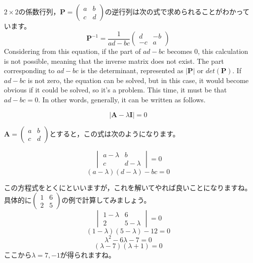 \documentclass{ltjsbook}
\begin{document}
$2 \times 2$の係数行列，$\bm{P}=\begin{pmatrix} a&b\\c&d \end{pmatrix}$の逆行列は次の式で求められることがわかっています。
\[ \bm{P}^{-1}= \frac{1}{ad-bc}\begin{pmatrix}d & -b \\ -c &a \end{pmatrix} \]
Considering from this equation, if the part of $ad - bc$ becomes 0, this calculation is not possible, meaning that the inverse matrix does not exist. The part corresponding to $ad-bc$ is the determinant, represented as $|\bm{P}|$ or $det(\bm{P})$.
If $ad-bc$ is not zero, the equation can be solved, but in this case, it would become obvious if it could be solved, so it's a problem. This time, it must be that $ad-bc=0$. In other words, generally, it can be written as follows.

\[ | \bm{A} - \lambda \bm{I} | = 0 \]

$\bm{A} = \begin{pmatrix} a & b \\ c & d \end{pmatrix} $とすると，この式は次のようになります。

\[   \begin{vmatrix} a-\lambda & b \\ c & d - \lambda \end{vmatrix} = 0 \]
\[ (a-\lambda)(d-\lambda) - bc = 0 \]

この方程式をとくにといいますが，これを解いてやれば良いことになりますね。具体的に$\begin{pmatrix}1&6\\2&5\end{pmatrix}$の例で計算してみましょう。
\[ \begin{vmatrix}1-\lambda & 6 \\ 2 & 5-\lambda\end{vmatrix}=0\]
\[ (1-\lambda)(5-\lambda) - 12 = 0 \]
\[ \lambda^2 - 6\lambda -7 = 0 \]
\[ (\lambda-7)(\lambda+1)=0\]
ここから$\lambda=7,-1$が得られますね。
\end{document}
